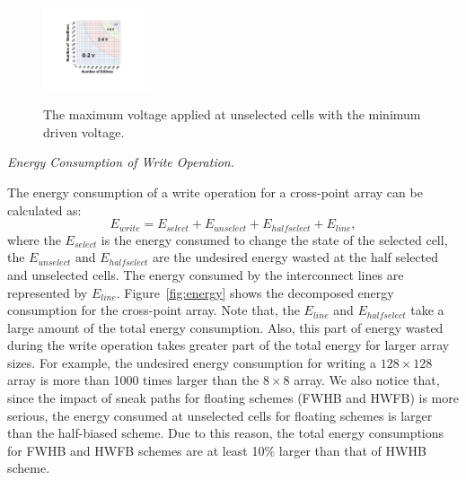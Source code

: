 \begin{figure}%
\centering
  \includegraphics[width=0.28\textwidth]{./figures/Theoretical_bound_f.pdf}\\
  \caption{The maximum voltage applied at unselected cells with the minimum driven voltage.}\label{fig:half}
  \vspace{-10pt}
\end{figure}



\vspace{6pt} \emph{Energy Consumption of Write Operation.} \vspace{6pt}

The energy consumption of a write operation for a cross-point array can be calculated as:
\begin{equation}
E_{write} = E_{select} + E_{unselect} + E_{halfselect} + E_{line},
\end{equation}
where the $E_{select}$ is the energy consumed to change the state of the
selected cell, the $E_{unselect}$ and $E_{halfselect}$ are the undesired energy wasted at the half selected and unselected cells. The energy consumed by the interconnect lines are represented by $E_{line}$. Figure~\ref{fig:energy} shows the decomposed energy consumption for the cross-point array. Note that, the $E_{line}$ and $E_{halfselect}$ take a large amount of the total energy consumption. Also, this part of energy wasted during the write operation takes greater part of the total energy for larger array sizes. For example, the undesired energy consumption for writing a $128{\times}128$ array is more than 1000 times larger than the $8{\times}8$ array. We also notice that, since the impact of sneak paths for floating schemes (FWHB and HWFB) is more serious, the energy consumed at unselected cells for floating schemes is larger than the half-biased scheme. Due to this reason, the total energy consumptions for FWHB and HWFB schemes are at least 10\% larger than that of HWHB scheme.


